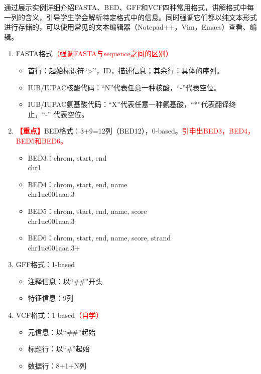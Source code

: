 \documentclass{TIJMUjiaoanLL}
\begin{document}
通过展示实例详细介绍FASTA、BED、GFF和VCF四种常用格式，讲解格式中每一列的含义，引导学生学会解析特定格式中的信息。同时强调它们都以纯文本形式进行存储的，可以使用常见的文本编辑器（Notepad++，Vim，Emacs）查看、编辑。
\begin{enumerate}
  \item FASTA格式\textcolor{red}{（强调FASTA与sequence之间的区别）}
    \begin{itemize}
      \item 首行：起始标识符“>”，ID，描述信息；其余行：具体的序列。
      \item IUB/IUPAC核酸代码：“N”代表任意一种核酸，“-”代表空位。
      \item IUB/IUPAC氨基酸代码：“X”代表任意一种氨基酸，“*”代表翻译终止，“-” 代表空位。
    \end{itemize}
  \item \textcolor{red}{\textbf{【重点】}}BED格式：3+9=12列（BED12），0-based。\textcolor{red}{引申出BED3，BED4，BED5和BED6。}
    \begin{itemize}
      \item BED3：chrom, start, end\\ \hspace*{1.35cm} chr1
      \item BED4：chrom, start, end, name\\ \hspace*{1.35cm} chr1\quad uc001aaa.3
      \item BED5：chrom, start, end, name, score\\ \hspace*{1.35cm} chr1\quad uc001aaa.3
      \item BED6：chrom, start, end, name, score, strand\\ \hspace*{1.35cm} chr1\quad uc001aaa.3\quad +
    \end{itemize}
  \item GFF格式：1-based
    \begin{itemize}
      \item 注释信息：以“\#\#”开头
      \item 特征信息：9列
    \end{itemize}
  \item VCF格式：1-based\textcolor{red}{（自学）}
    \begin{itemize}
      \item 元信息：以“\#\#”起始
      \item 标题行：以“\#”起始
      \item 数据行：8+1+N列
    \end{itemize}
\end{enumerate}
\end{document}
